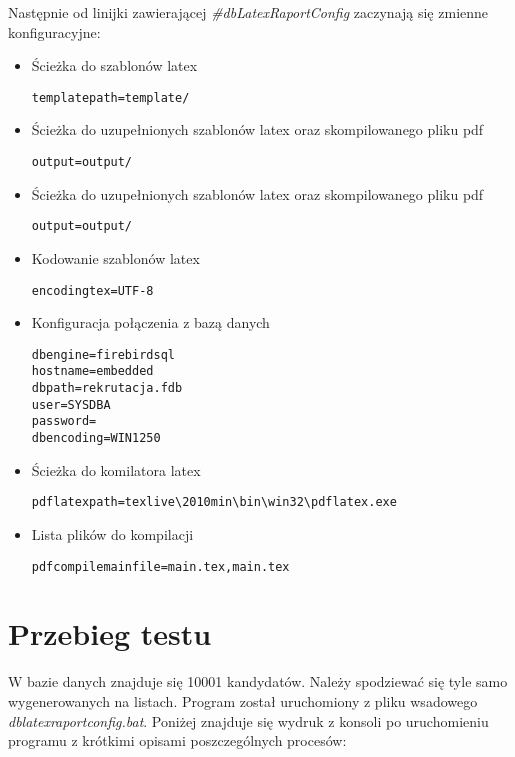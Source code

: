 Następnie od linijki zawierającej \emph{\#dbLatexRaportConfig} zaczynają się zmienne konfiguracyjne:
  \begin{itemize}
  \item Ścieżka do szablonów latex
   \begin{lstlisting}
templatepath=template/
  \end{lstlisting}
  \item Ścieżka do uzupełnionych szablonów latex oraz skompilowanego pliku pdf
  \begin{lstlisting}
output=output/
 \end{lstlisting}
 \item Ścieżka do uzupełnionych szablonów latex oraz skompilowanego pliku pdf
  \begin{lstlisting}
output=output/
 \end{lstlisting}
  \item Kodowanie szablonów latex
   \begin{lstlisting}
encodingtex=UTF-8
  \end{lstlisting}
   \item Konfiguracja połączenia z bazą danych
    \begin{lstlisting}
dbengine=firebirdsql
hostname=embedded
dbpath=rekrutacja.fdb
user=SYSDBA
password=
dbencoding=WIN1250
   \end{lstlisting}
  \item Ścieżka do komilatora latex
   \begin{lstlisting}
pdflatexpath=texlive\2010min\bin\win32\pdflatex.exe
  \end{lstlisting}
    \item Lista plików do kompilacji
 \begin{lstlisting}
pdfcompilemainfile=main.tex,main.tex
\end{lstlisting}
\end{itemize}
\section{Przebieg testu}

W bazie danych znajduje się 10001 kandydatów. Należy spodziewać się tyle samo wygenerowanych na listach.  Program został uruchomiony z pliku wsadowego \emph{dblatexraportconfig.bat}. Poniżej znajduje się wydruk z konsoli po uruchomieniu programu z krótkimi opisami poszczególnych procesów:

